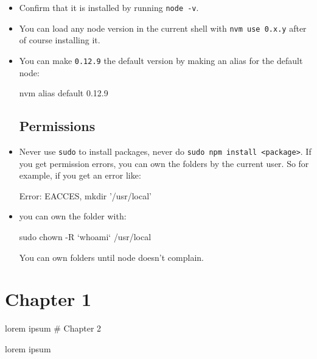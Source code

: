 \documentclass[12pt,]{article}
\newenvironment{Shaded}{}{}
\newcommand{\KeywordTok}[1]{\textcolor[rgb]{0.00,0.00,1.00}{{#1}}}
\newcommand{\StringTok}[1]{\textcolor[rgb]{0.00,0.50,0.50}{{#1}}}
\newcommand{\NormalTok}[1]{{#1}}
\begin{document}
\begin{itemize}
\item
  Confirm that it is installed by running \texttt{node\ -v}.
\item
  You can load any node version in the current shell with
  \texttt{nvm\ use\ 0.x.y} after of course installing it.
\item
  You can make \texttt{0.12.9} the default version by making an alias
  for the default node:

\begin{Shaded}
\begin{Highlighting}[numbers=left,,]
\KeywordTok{nvm} \NormalTok{alias default 0.12.9}
\end{Highlighting}
\end{Shaded}

  \subsection{Permissions}\label{permissions}
\item
  Never use \texttt{sudo} to install packages, never do
  \texttt{sudo\ npm\ install\ \textless{}package\textgreater{}}. If you
  get permission errors, you can own the folders by the current user. So
  for example, if you get an error like:

\begin{Shaded}
\begin{Highlighting}[numbers=left,,]
\KeywordTok{Error}\NormalTok{: EACCES, mkdir }\StringTok{'/usr/local'}
\end{Highlighting}
\end{Shaded}
\item
  you can own the folder with:

\begin{Shaded}
\begin{Highlighting}[numbers=left,,]
\KeywordTok{sudo} \NormalTok{chown -R }\KeywordTok{`whoami`} \NormalTok{/usr/local}
\end{Highlighting}
\end{Shaded}

  You can own folders until node doesn't complain.
\end{itemize}

\section{Chapter 1}\label{chapter-1}

lorem ipsum \# Chapter 2

lorem ipsum
\end{document}
